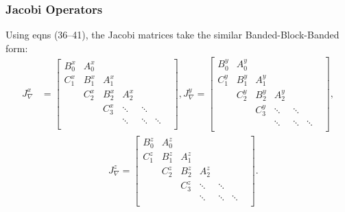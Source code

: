 \documentclass[10pt]{beamer}
\begin{document}
\frame
{
    \frametitle{Jacobi Operators}
    
Using eqns (36--41), the Jacobi matrices take the similar Banded-Block-Banded form:
\begin{align}
J_\nabla^x &= \begin{bmatrix}
		B^x_0 & A^x_0 & & & & \\
		C^x_1 & B^x_1 & A^x_1 & & & \\
		& C^x_2 & B^x_2 & A^x_2  & & & \\
		& & C^x_3 & \ddots & \ddots & \\
		& & & \ddots & \ddots & \ddots \\
	\end{bmatrix},
J_\nabla^y = \begin{bmatrix}
		B^y_0 & A^y_0 & & & & \\
		C^y_1 & B^y_1 & A^y_1 & & & \\
		& C^y_2 & B^y_2 & A^y_2  & & & \\
		& & C^y_3 & \ddots & \ddots & \\
		& & & \ddots & \ddots & \ddots \\
	\end{bmatrix}, \nonumber \\
&\quad \quad \quad \quad \quad \quad \quad J_\nabla^z = \begin{bmatrix}
		B^z_0 & A^z_0 & & & & \\
		C^z_1 & B^z_1 & A^z_1 & & & \\
		& C^z_2 & B^z_2 & A^z_2  & & & \\
		& & C^z_3 & \ddots & \ddots & \\
		& & & \ddots & \ddots & \ddots \\
	\end{bmatrix}.
\end{align}

}
\end{document}
